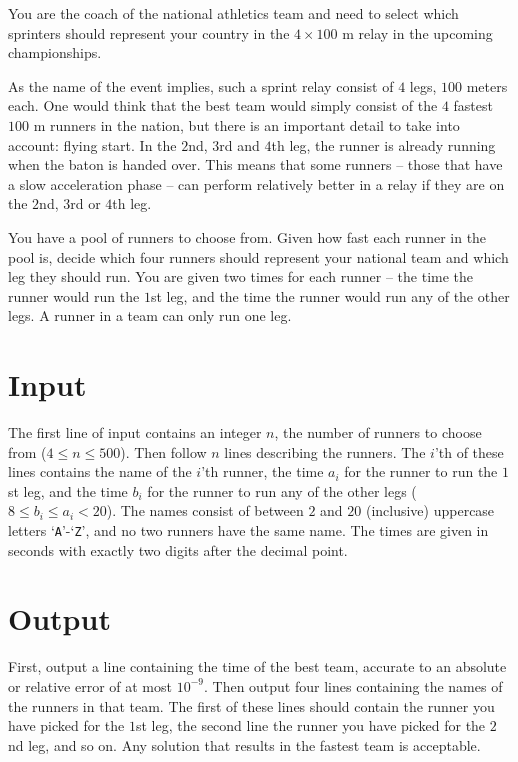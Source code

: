 
%
You are the coach of the national athletics team and need to select which sprinters
should represent your country in the $4 \times 100$ m relay in the upcoming championships.

As the name of the event implies, such a sprint relay consist of $4$ legs, $100$ meters each.
One would think that the best team would simply consist of the $4$ fastest $100$ m runners
in the nation, but there is an important detail to take into account: flying start.
In the $2$nd, $3$rd and $4$th leg, the runner is already running when the baton is handed over.
This means that some runners -- those that have a slow acceleration phase -- can perform relatively
better in a relay if they are on the $2$nd, $3$rd or $4$th leg.

You have a pool of runners to choose from. Given how fast each runner in the pool is,
decide which four runners should represent your national team and which leg they should run.
You are given two times for each runner -- the time the runner would run the $1$st leg,
and the time the runner would run any of the other legs. A runner in a team can only run one leg.

\section*{Input}

The first line of input contains an integer $n$, the number
of runners to choose from ($4 \leq n \leq 500$).
Then follow $n$ lines describing the runners.  The $i$'th of these lines contains the name of the $i$'th runner,
the time $a_i$ for the runner to run the $1$st leg, and the time $b_i$ for the runner to run any of the other legs ($8 \le b_i \le a_i < 20$).
The names consist of between $2$ and $20$ (inclusive) uppercase letters `\texttt{A}'-`\texttt{Z}', and no two runners have the same name.
The times are given in seconds with exactly two digits
after the decimal point.

\section*{Output}

First, output a line containing the time of the best team, accurate to an absolute or relative error of at most $10^{-9}$.  Then output four lines containing the names of the runners in that
team.  The first of these lines should contain the runner you have
picked for the $1$st leg, the second line the runner you have picked
for the $2$nd leg, and so on. Any solution that results in the fastest
team is acceptable.

